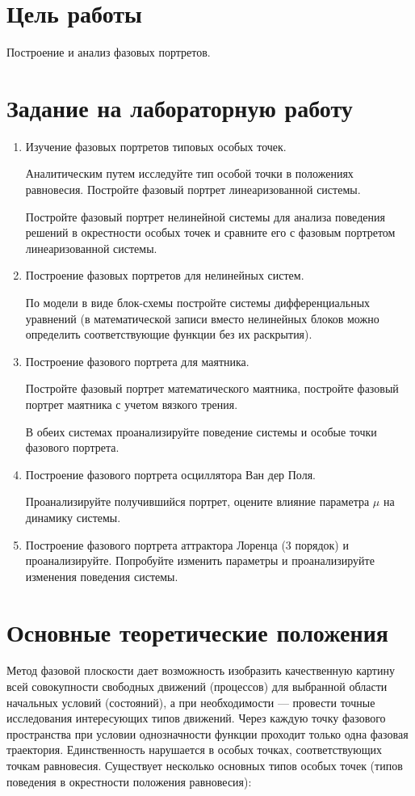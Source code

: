 \section{Цель работы}
Построение и анализ фазовых портретов.
\section{Задание на лабораторную работу}
\begin{enumerate}
	\item Изучение фазовых портретов типовых особых точек.
	
	Аналитическим путем исследуйте тип особой точки в положениях равновесия. Постройте фазовый портрет линеаризованной системы.

	Постройте фазовый портрет нелинейной системы для анализа поведения решений в окрестности особых точек и сравните его с фазовым портретом линеаризованной системы.
	\item Построение фазовых портретов для нелинейных систем.
	
	По модели в виде блок-схемы постройте системы дифференциальных уравнений (в математической записи вместо нелинейных блоков можно определить соответствующие функции без их раскрытия).
	\item Построение фазового портрета для маятника.
	
	Постройте фазовый портрет математического маятника, постройте фазовый портрет маятника с учетом вязкого трения.

	В обеих системах проанализируйте поведение системы и особые точки фазового портрета.
	\item Построение фазового портрета осциллятора Ван дер Поля.
	
	Проанализируйте получившийся портрет, оцените влияние параметра $\mu$ на динамику системы.
	\item Построение фазового портрета аттрактора Лоренца (3 порядок) и проанализируйте. Попробуйте изменить параметры и проанализируйте изменения поведения системы.
\end{enumerate}
\section{Основные теоретические положения}

Метод фазовой плоскости дает возможность изобразить качественную картину всей совокупности свободных движений (процессов) 
для выбранной области начальных условий (состояний), а при необходимости — провести точные исследования интересующих типов движений. 
Через каждую точку фазового пространства при условии однозначности функции проходит только одна фазовая траектория. Единственность нарушается в особых точках, соответствующих точкам равновесия. 
Существует несколько основных типов особых точек (типов поведения в окрестности положения равновесия):


